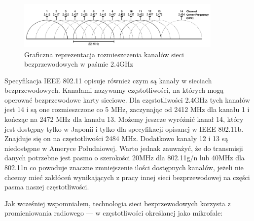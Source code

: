 \begin{figure}[h!]
  \centering
    \includegraphics[width=10cm]{images/wifi_channels}
  \caption{Graficzna reprezentacja rozmieszczenia kanałów sieci bezprzewodowych w paśmie 2.4GHz}
  \label{fig:wifiChannels}
\end{figure}

Specyfikacja IEEE 802.11 opisuje również czym są kanały w sieciach bezprzewodowych. Kanałami nazywamy częstotliwości, na których mogą operować bezprzewodowe karty sieciowe. Dla częstotliwości 2.4GHz tych kanałów jest 14 i są one rozmieszczone co 5 MHz, zaczynając od 2412 MHz dla kanału 1 i kończąc na 2472 MHz dla kanału 13. Możemy jeszcze wyróżnić kanał 14, który jest dostępny tylko w Japonii i tylko dla specyfikacji opisanej w IEEE 802.11b. Znajduje się on na częstotliwości 2484 MHz. Dodatkowo kanały 12 i 13 są niedostępne w Ameryce Południowej. Warto jednak zauważyć, że do transmisji danych potrzebne jest pasmo o szerokości 20MHz dla 802.11g/n lub 40MHz dla 802.11n co powoduje znaczne zmniejszenie ilości dostępnych kanałów, jeżeli nie chcemy mieć zakłóceń wynikających z pracy innej sieci bezprzewodowej na części pasma naszej częstotliwości.\cite{WifiChannelsWiki}

Jak wcześniej wspomniałem, technologia sieci bezprzewodowych korzysta z promieniowania radiowego — w częstotliwości określanej jako mikrofale:\cite{FaleRadioweWiki}

